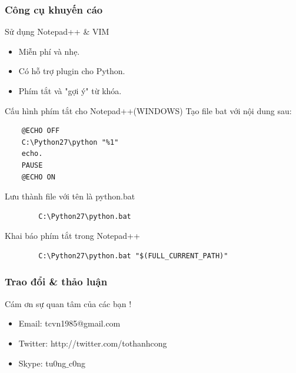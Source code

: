 \documentclass[10pt]{beamer}
\newcommand\sFontvi{\fontsize{8}{7.2}\selectfont} %
\begin{document}
\label{Slide: Cong cu khuyen cao Notepad++}
\begin{frame}[fragile]
\frametitle{Công cụ khuyến cáo}
\begin{block}{Sử dụng Notepad++ \& VIM}
\begin{itemize}
\item Miễn phí và nhẹ.
\item Có hỗ trợ plugin cho Python.
\item Phím tắt và "gợi ý" từ khóa.
\end{itemize}
\end{block}
\sFontvi
\begin{block}{Cấu hình phím tắt cho Notepad++(WINDOWS)}
Tạo file bat với nội dung sau:
\begin{verbatim}
	@ECHO OFF
	C:\Python27\python "%1"
	echo.
	PAUSE
	@ECHO ON
\end{verbatim}
Lưu thành file với tên là python.bat
\noindent 
\begin{verbatim}
 		C:\Python27\python.bat
\end{verbatim} 
Khai báo phím tắt trong Notepad++ 
\begin{verbatim}
		C:\Python27\python.bat "$(FULL_CURRENT_PATH)"
\end{verbatim}
\end{block}
\end{frame}
\label{Trao doi & Thao Luan}
\begin{frame}
\frametitle{Trao đổi \& thảo luận}
\Huge{\centerline{Cám ơn sự quan tâm của các bạn !}}
\sFontvi	
	\begin{itemize}
		\item Email: tcvn1985@gmail.com
		\item Twitter: http://twitter.com/tothanhcong
		\item Skype: tu0ng$\_$c0ng
	\end{itemize}
\end{frame}
\end{document}
